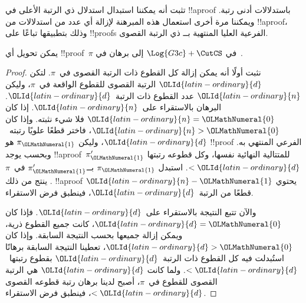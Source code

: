 \documentclass[../../../include/open-logic-section]{subfiles}
\begin{document}


تثبت  أنه يمكننا استبدال استدلال \CutCS{} ذي
الرتبة الأعلى في !!a{proof} باستدلالات \CutCS{} أدنى رتبة. ويمكننا مرة
أخرى استعمال هذه المبرهنة لإزالة أي عدد من استدلالات \CutCS{} من
!!a{proof}، وذلك بتطبيقها تباعًا على !!{proof}s الفرعية العليا المنتهية
بــ\CutCS{} ذي الرتبة القصوى.

\begin{thm}
يمكن تحويل أي !!{proof}~$\pi$ في $\Log{G3c} + \CutCS$ إلى برهان في~.
\end{thm}

\begin{proof}
  نثبت أولًا أنه يمكن إزالة كل القطوع ذات الرتبة القصوى في~$\pi$. لتكن
  $\OLId{latin-ordinary}{d}$ الرتبة القصوى للقطوع الواقعة في~$\pi$، وليكن $\OLId{latin-ordinary}{n}$ عدد القطوع ذات
  الرتبة~$\OLId{latin-ordinary}{d}$. البرهان بالاستقراء على~$\OLId{latin-ordinary}{n}$. إذا كان $\OLId{latin-ordinary}{n}=\OLMathNumeral{0}$ فلا شيء نثبته.
  وإذا كان $\OLId{latin-ordinary}{n}>\OLMathNumeral{0}$، فاختر قطعًا علويًا رتبته~$\OLId{latin-ordinary}{d}$، وليكن $\pi_\OLMathNumeral{1}$ هو
  !!{proof} الفرعي المنتهي به. وبحسب  يوجد
  !!a{proof}~$\pi_\OLMathNumeral{1}'$ للمتتالية النهائية نفسها، وكل قطوعه رتبتها $<\OLId{latin-ordinary}{d}$.
  استبدل $\pi_\OLMathNumeral{1}$ بــ$\pi_\OLMathNumeral{1}'$ في~$\pi$. ينتج من ذلك !!a{proof} يحتوي
  $\OLId{latin-ordinary}{n}-\OLMathNumeral{1}$ قطعًا من الرتبة~$\OLId{latin-ordinary}{d}$، فينطبق فرض الاستقراء.

  والآن تتبع النتيجة بالاستقراء على~$\OLId{latin-ordinary}{d}$. فإذا كان $\OLId{latin-ordinary}{d}=\OLMathNumeral{0}$، كانت جميع القطوع
  ذرية، ويمكن إزالة جميعها بحسب النتيجة السابقة. وإذا كان $\OLId{latin-ordinary}{d}>\OLMathNumeral{0}$، تعطينا
  النتيجة السابقة برهانًا استُبدلت فيه كل القطوع ذات الرتبة~$\OLId{latin-ordinary}{d}$ بقطوع
  رتبتها~$<\OLId{latin-ordinary}{d}$. ولما كانت $\OLId{latin-ordinary}{d}$ هي الرتبة القصوى للقطوع في~$\pi$، أصبح لدينا
  برهان رتبة قطوعه القصوى $<\OLId{latin-ordinary}{d}$، فينطبق فرض الاستقراء.
\end{proof}
\end{document}
